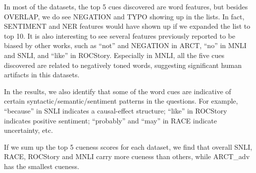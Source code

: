 In most of the datasets, the top 5 cues discovered are word features,
but besides OVERLAP, we do see NEGATION and TYPO showing up
in the lists. In fact, SENTIMENT and NER features would have shown up
if we expanded the list to top 10. It is also interesting to see several features previously
reported to be biased by other works, such as ``not'' and NEGATION in
ARCT, ``no'' in MNLI and SNLI, and ``like'' in ROCStory.  Especially in
MNLI, all the five cues discovered are related to negatively toned words,
suggesting significant human artifacts in this datasets.
 
In the results, we also identify that some of the word cues are indicative of
certain syntactic/semantic/sentiment patterns in the questions. For example, ``because'' in SNLI
indicates a causal-effect structure; ``like'' in ROCStory indicates positive sentiment;
``probably'' and ``may'' in RACE indicate uncertainty, etc. 

If we sum up the top 5 cueness scores for each dataset, we find that
overall SNLI, RACE, ROCStory and MNLI carry more cueness than others,
while ARCT\_adv has the smallest cueness. 


